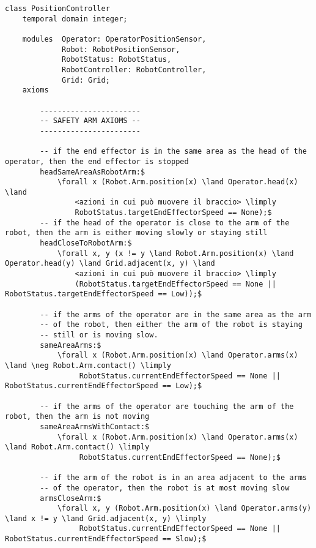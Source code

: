 \begin{lstlisting}[fontadjust, mathescape, frame=tlb] 
class PositionController
    temporal domain integer;

    modules  Operator: OperatorPositionSensor,
             Robot: RobotPositionSensor,
             RobotStatus: RobotStatus,
             RobotController: RobotController,
             Grid: Grid;
    axioms
    
        -----------------------
        -- SAFETY ARM AXIOMS --
        -----------------------
        
        -- if the end effector is in the same area as the head of the operator, then the end effector is stopped
        headSameAreaAsRobotArm:$
            \forall x (Robot.Arm.position(x) \land Operator.head(x) \land
                <azioni in cui può muovere il braccio> \limply
                RobotStatus.targetEndEffectorSpeed == None);$
        -- if the head of the operator is close to the arm of the robot, then the arm is either moving slowly or staying still
        headCloseToRobotArm:$
            \forall x, y (x != y \land Robot.Arm.position(x) \land Operator.head(y) \land Grid.adjacent(x, y) \land
                <azioni in cui può muovere il braccio> \limply
                (RobotStatus.targetEndEffectorSpeed == None || RobotStatus.targetEndEffectorSpeed == Low));$

        -- if the arms of the operator are in the same area as the arm
        -- of the robot, then either the arm of the robot is staying
        -- still or is moving slow.
        sameAreaArms:$
            \forall x (Robot.Arm.position(x) \land Operator.arms(x) \land \neg Robot.Arm.contact() \limply
                 RobotStatus.currentEndEffectorSpeed == None || RobotStatus.currentEndEffectorSpeed == Low);$

        -- if the arms of the operator are touching the arm of the robot, then the arm is not moving
        sameAreaArmsWithContact:$
            \forall x (Robot.Arm.position(x) \land Operator.arms(x) \land Robot.Arm.contact() \limply
                 RobotStatus.currentEndEffectorSpeed == None);$

        -- if the arm of the robot is in an area adjacent to the arms
        -- of the operator, then the robot is at most moving slow
        armsCloseArm:$
            \forall x, y (Robot.Arm.position(x) \land Operator.arms(y) \land x != y \land Grid.adjacent(x, y) \limply
                 RobotStatus.currentEndEffectorSpeed == None || RobotStatus.currentEndEffectorSpeed == Slow);$


\end{lstlisting}
